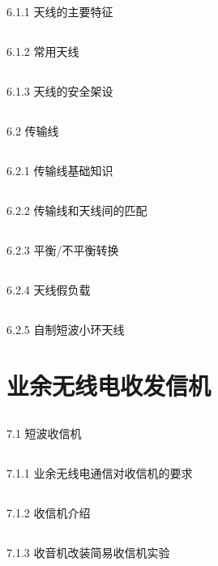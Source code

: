 \documentclass[12pt,UTF8]{ctexbook}
\begin{document}
\section{}6.1.1 天线的主要特征
\section{}6.1.2 常用天线
\section{}6.1.3 天线的安全架设
\section{}6.2 传输线
\section{}6.2.1 传输线基础知识
\section{}6.2.2 传输线和天线间的匹配
\section{}6.2.3 平衡/不平衡转换
\section{}6.2.4 天线假负载
\section{}6.2.5 自制短波小环天线

\chapter{业余无线电收发信机}

\section{}7.1 短波收信机
\section{}7.1.1 业余无线电通信对收信机的要求
\section{}7.1.2 收信机介绍
\section{}7.1.3 收音机改装简易收信机实验
\end{document}
